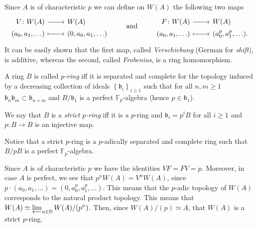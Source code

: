 \begin{defn}
	Since $A$ is of characteristic $p$ we can define on $W(A)$ the following two
	maps
	\begin{equation*}
	\begin{tikzcd}[row sep = 0ex
		,/tikz/column 1/.append style={anchor=base east}
		,/tikz/column 2/.append style={anchor=base west}]
		V\colon W(A) \arrow[r, "", rightarrow] &
		W(A) \\
		(a_0, a_1, \ldots) \arrow[r, "", mapsto] & 
		(0, a_0, a_1, \ldots)
	\end{tikzcd}
	\qquad \text{ and } \qquad
	\begin{tikzcd}[row sep = 0ex
		,/tikz/column 1/.append style={anchor=base east}
		,/tikz/column 2/.append style={anchor=base west}]
		F\colon W(A) \arrow[r, "", rightarrow] &
		W(A) \\
		(a_0, a_1, \ldots) \arrow[r, "", mapsto] & 
		(a_0^p, a_1^p, \ldots)
	.\end{tikzcd}
	\end{equation*} 
	It can be easily shown that the first map, called {\em Verschiebung}
	(German for {\em shift}), is additive, whereas the second, called {\em Frobenius},
	is a ring homomorphism.
\end{defn}


\begin{defn}
	A ring $B$ is called {\em $p$-ring} iff it is separated and complete
	for the topology induced by a decreasing collection of ideals
	$\left\{ \mathfrak{b}_i \right\}_{i \geq 1}$ such that for all $n,m \geq 1$
	$\mathfrak{b}_n \mathfrak{b}_m \subset \mathfrak{b}_{n+m}$ and
	$B/\mathfrak{b}_1$ is a perfect $\mathbb{F}_p$-algebra
	(hence $p \in \mathfrak{b}_1$).

	We say that $B$ is a {\em strict $p$-ring} iff it is a $p$-ring
	and $\mathfrak{b}_i = p^iB$ for all $i \geq 1$
	and $p\colon B \to B$ is an injective map.
\end{defn}


\begin{rem}[]
	Notice that a strict $p$-ring is a $p$-adically separated and complete
	ring such that $B/pB$ is a perfect $\mathbb{F}_p$-algebra.
\end{rem}


\begin{rem}[]
	Since $A$ is of characteristic $p$ we have the identities
	$VF = FV = p$.
	Moreover, in case $A$ is perfect, we see that $p^nW(A) = V^nW(A)$,
	since $p \cdot \left( a_0, a_1, \ldots \right) =
	(0, a_0^p, a_1^p, \ldots)$.
	This means that the $p$-adic topology of $W(A)$ corresponds
	to the natural product topology.
	This means that $W(A) \simeq \varprojlim_{n \in \mathbb{N}} W(A)/ (p^n)$.
	Then, since $W(A)/ (p) \simeq A$, that $W(A)$ is a strict $p$-ring.
\end{rem}


